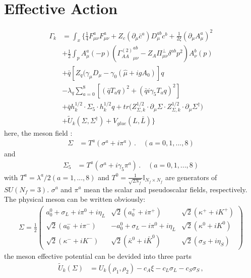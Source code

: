 \documentclass[12pt]{article}
\begin{document}
\section{Effective Action}
\begin{align}
\Gamma_k&=\int_x\bigg \{ \frac{1}{4} F_{\mu\nu}^a F_{\mu\nu}^a+Z_c (\partial_\mu \bar c^a) D_{\mu}^{a b} c^{b}+\frac{1}{2\xi}(\partial_\mu A_{\mu}^{a})^2\\ \nonumber
&+\frac{1}{2}\int_p A^a_{\mu}(-p) ({\Gamma_{AA}^{(2)}}_{\mu \nu}^{ab}-Z_A \Pi_{\mu \nu}^{\perp}\delta^{ab} p^2)A _{\nu}^b(p)\\  \nonumber
&+\bar q [Z_q (\gamma_\mu D_\mu-\gamma_0(\hat \mu+ig A_0)]q \\  \nonumber
&-\lambda_q \sum_{a=0}^8 [(\bar q T_a  q)^2+(\bar q i \gamma _5 T_a q)^2]\\  \nonumber
&+\bar q  h_{k}^{1/2}  \cdot \Sigma_{5} \cdot h_{k}^{1/2} q+tr \big (Z_{\Sigma,k}^{1/2} \cdot \partial_\mu\Sigma \cdot Z_{\Sigma,k}^{1/2}\cdot \partial_\mu\Sigma^\dagger\bigr)  \\  \nonumber
&+\tilde U_k(\Sigma,\Sigma^\dagger)+V_{glue}(L,\bar L)
\bigg \}
\end{align}
here, the meson field :
\begin{align}
  \Sigma&=T^a(\sigma^a+i \pi^a)\,. \quad (a=0,1,...,8)\label{}
\end{align}
and 
\begin{align}
  \Sigma_5&=T^a(\sigma^a+i \gamma_5 \pi^a)\,. \quad (a=0,1,...,8)\label{}
\end{align}
with $T^a=\lambda^a/2(a=1,...,8)$ and $T^{0}=\frac{1}{\sqrt{2N_{f}}}\mathbb{I}_{N_{f}\times N_{f}}$ are generators of $SU(N_f=3)$. $\sigma^a$ and $\pi^a$ mean the scalar and pseudoscalar fields, respectively. The physical meson can be written obviously:
\begin{align}
\Sigma=\frac{1}{2}\begin{pmatrix}
a_0^0+\sigma_L+i\pi^0 + i\eta_L& \sqrt{2}(a_0^{+} +i \pi^{+}) & \sqrt{2} (\kappa^{+} +i K^{+})\\
\sqrt{2} (a_0^{-} +i \pi^{-}) & -a_0^0+\sigma_L - i\pi^0  + i\eta_L & \sqrt{2}(\kappa^0+i K^0) \\
\sqrt{2} (\kappa^{-} + i K^{-}) & \sqrt{2} (\bar \kappa^0 + i \bar K^0) & \sqrt{2} (\sigma_S + i \eta_S)\end{pmatrix}\label{eq:mesonmatrix}
\end{align}
the meson effective potential can be devided into three parts
\begin{align}
  \tilde{U}_{k}(\Sigma)&=U_k(\rho_1,\rho_2)-c_A \xi-c_L\sigma_L-c_S\sigma_S\,, \label{eq:tildeU}
\end{align}
\end{document}
